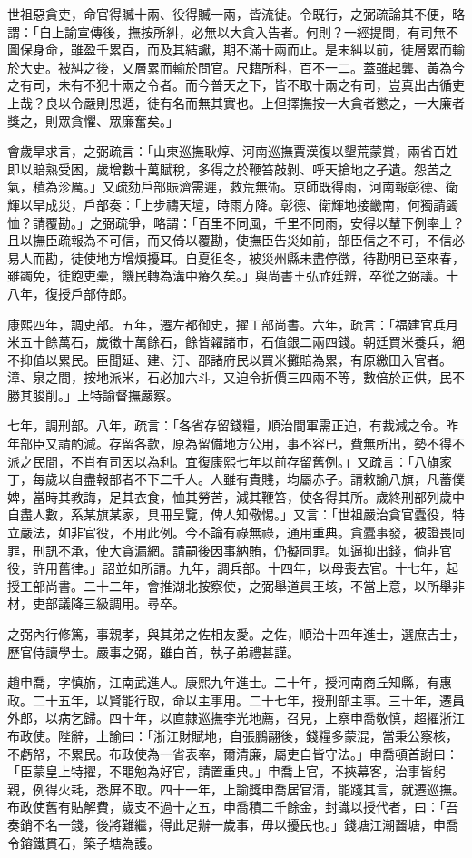 \begin{pinyinscope}
世祖惡貪吏，命官得贓十兩、役得贓一兩，皆流徙。令既行，之弼疏論其不便，略謂：「自上諭宣傳後，撫按所糾，必無以大貪入告者。何則？一經提問，有司無不圖保身命，雖盈千累百，而及其結讞，期不滿十兩而止。是未糾以前，徒層累而輸於大吏。被糾之後，又層累而輸於問官。尺籍所科，百不一二。蓋雖起龔、黃為今之有司，未有不犯十兩之令者。而今普天之下，皆不取十兩之有司，豈真出古循吏上哉？良以令嚴則思遁，徒有名而無其實也。上但擇撫按一大貪者懲之，一大廉者獎之，則眾貪懼、眾廉奮矣。」

會歲旱求言，之弼疏言：「山東巡撫耿焞、河南巡撫賈漢復以墾荒蒙賞，兩省百姓即以賠熟受困，歲增數十萬賦稅，多得之於鞭笞敲剝、呼天搶地之孑遺。怨苦之氣，積為沴厲。」又疏劾戶部賑濟需遲，救荒無術。京師既得雨，河南報彰德、衛輝以旱成災，戶部奏：「上步禱天壇，時雨方降。彰德、衛輝地接畿南，何獨請蠲恤？請覆勘。」之弼疏爭，略謂：「百里不同風，千里不同雨，安得以輦下例率土？且以撫臣疏報為不可信，而又倚以覆勘，使撫臣告災如前，部臣信之不可，不信必易人而勘，徒使地方增煩擾耳。自夏徂冬，被災州縣未盡停徵，待勘明已至來春，雖蠲免，徒飽吏橐，饑民轉為溝中瘠久矣。」與尚書王弘祚廷辨，卒從之弼議。十八年，復授戶部侍郎。

康熙四年，調吏部。五年，遷左都御史，擢工部尚書。六年，疏言：「福建官兵月米五十餘萬石，歲徵十萬餘石，餘皆糴諸市，石值銀二兩四錢。朝廷買米養兵，絕不抑值以累民。臣聞延、建、汀、邵諸府民以買米攤賠為累，有原繳田入官者。漳、泉之間，按地派米，石必加六斗，又迫令折價三四兩不等，數倍於正供，民不勝其朘削。」上特諭督撫嚴察。

七年，調刑部。八年，疏言：「各省存留錢糧，順治間軍需正迫，有裁減之令。昨年部臣又請酌減。存留各款，原為留備地方公用，事不容已，費無所出，勢不得不派之民間，不肖有司因以為利。宜復康熙七年以前存留舊例。」又疏言：「八旗家丁，每歲以自盡報部者不下二千人。人雖有貴賤，均屬赤子。請敕諭八旗，凡蓄僕婢，當時其教誨，足其衣食，恤其勞苦，減其鞭笞，使各得其所。歲終刑部列歲中自盡人數，系某旗某家，具冊呈覽，俾人知儆惕。」又言：「世祖嚴治貪官蠹役，特立嚴法，如非官役，不用此例。今不論有祿無祿，通用重典。貪蠹事發，被證畏同罪，刑訊不承，使大貪漏網。請嗣後因事納賄，仍擬同罪。如逼抑出錢，倘非官役，許用舊律。」詔並如所請。九年，調兵部。十四年，以母喪去官。十七年，起授工部尚書。二十二年，會推湖北按察使，之弼舉道員王垓，不當上意，以所舉非材，吏部議降三級調用。尋卒。

之弼內行修篤，事親孝，與其弟之佐相友愛。之佐，順治十四年進士，選庶吉士，歷官侍讀學士。嚴事之弼，雖白首，執子弟禮甚謹。

趙申喬，字慎旃，江南武進人。康熙九年進士。二十年，授河南商丘知縣，有惠政。二十五年，以賢能行取，命以主事用。二十七年，授刑部主事。三十年，遷員外郎，以病乞歸。四十年，以直隸巡撫李光地薦，召見，上察申喬敬慎，超擢浙江布政使。陛辭，上諭曰：「浙江財賦地，自張鵬翮後，錢糧多蒙混，當秉公察核，不虧帑，不累民。布政使為一省表率，爾清廉，屬吏自皆守法。」申喬頓首謝曰：「臣蒙皇上特擢，不黽勉為好官，請置重典。」申喬上官，不挾幕客，治事皆躬親，例得火耗，悉屏不取。四十一年，上諭獎申喬居官清，能踐其言，就遷巡撫。布政使舊有貼解費，歲支不過十之五，申喬積二千餘金，封識以授代者，曰：「吾奏銷不名一錢，後將難繼，得此足辦一歲事，毋以擾民也。」錢塘江潮齧塘，申喬令鎔鐵貫石，築子塘為護。


\end{pinyinscope}
